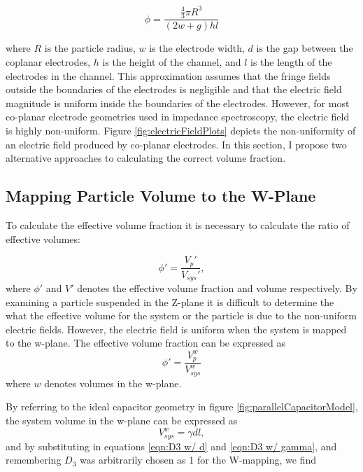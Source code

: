 \begin{equation}
    \phi = \frac{\frac{4}{3}\pi R^3}{(2w+g)hl}
\end{equation}

\noindent where $R$ is the particle radius, $w$ is the electrode width, $d$ is the gap between the coplanar electrodes, $h$ is the height of the channel, and $l$ is the length of the electrodes in the channel. This approximation assumes that the fringe fields outside the boundaries of the electrodes is negligible and that the electric field magnitude is uniform inside the boundaries of the electrodes. However, for most co-planar electrode geometries used in impedance spectroscopy, the electric field is highly non-uniform. Figure \ref{fig:electricFieldPlots} depicts the non-uniformity of an electric field produced by co-planar electrodes. In this section, I propose two alternative approaches to calculating the correct volume fraction. 

\subsection*{Mapping Particle Volume to the W-Plane}
\par To calculate the effective volume fraction it is necessary to calculate the ratio of effective volumes:

\begin{equation}
    \phi ' = \frac{V_p'}{V_{sys}'},
\end{equation}
\noindent where $\phi '$ and $V '$ denotes the effective volume fraction and volume respectively. By examining a particle suspended in the Z-plane it is difficult to determine the what the effective volume for the system or the particle is due to the non-uniform electric fields. However, the electric field is uniform when the system is mapped to the w-plane. The effective volume fraction can be expressed as 
\begin{equation}
    \phi ' = \frac{V^w_p}{V^w_{sys}}
\end{equation}
\noindent where $w$ denotes volumes in the w-plane.

\par By referring to the ideal capacitor geometry in figure \ref{fig:parallelCapacitorModel}, the system volume in the w-plane can be expressed as 
\begin{equation}
    V^w_{sys} = \gamma d l,    
\end{equation}
\noindent and by substituting in equations \ref{eqn:D3 w/ d} and \ref{eqn:D3 w/ gamma}, and remembering $D_3$ was arbitrarily chosen as 1 for the W-mapping, we find

